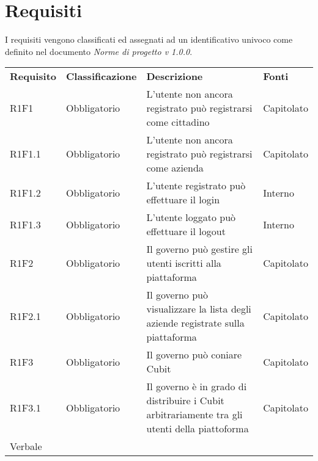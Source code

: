 
\section{Requisiti} 
I requisiti vengono classificati ed assegnati ad un identificativo  univoco come definito nel documento \textit{Norme di progetto v 1.0.0}.
\renewcommand{\arraystretch}{1.5}
\begin{center}
	
	\begin{longtable}{ >{\centering}p{} >{\centering}p{}
			>{\raggedright}p{} >{\centering}p{}}
		
		\rowcolorhead 
		\textbf{\color{white}Requisito} 
		& \textbf{\color{white}Classificazione} 
		& \centering\textbf{\color{white}Descrizione}
		& \textbf{\color{white}Fonti} 
		\tabularnewline 	
		
		R1F1 & Obbligatorio & L'utente non ancora registrato può registrarsi come cittadino 
		& Capitolato
		\tabularnewline
		R1F1.1 & Obbligatorio & L'utente non ancora registrato può registrarsi come azienda 
		& Capitolato
		\tabularnewline
		R1F1.2 & Obbligatorio & L'utente registrato può effettuare il login &
		Interno
		\tabularnewline
		R1F1.3 & Obbligatorio & L'utente loggato può effettuare il logout & Interno
		\tabularnewline
	
		R1F2 & Obbligatorio & Il governo può gestire gli utenti iscritti alla piattaforma  & Capitolato
		\tabularnewline
		R1F2.1 & Obbligatorio & Il governo può visualizzare la lista degli aziende registrate sulla piattaforma & Capitolato
		\tabularnewline
		R1F3 & Obbligatorio & Il governo può coniare Cubit & Capitolato 
		\tabularnewline 
		R1F3.1 & Obbligatorio & Il governo è in grado di distribuire i Cubit arbitrariamente tra gli utenti della piattoforma & Capitolato \\ Verbale
		\tabularnewline
	
		
		
		
	\end{longtable}
\end{center}

